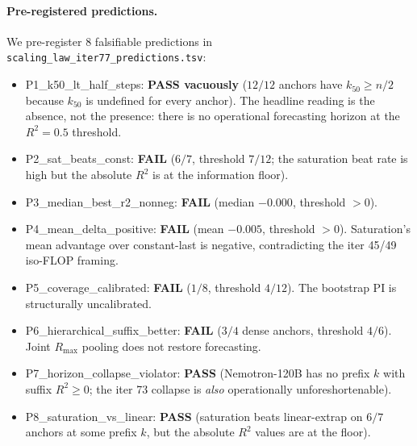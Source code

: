 \paragraph{Pre-registered predictions.}
\label{par:scaling-iter77-preds}
We pre-register 8 falsifiable predictions in
\texttt{scaling\_law\_iter77\_predictions.tsv}:
\begin{itemize}
  \item P1\_k50\_lt\_half\_steps: \textbf{PASS vacuously} ($12/12$
        anchors have $k_{50} \geq n/2$ because $k_{50}$ is undefined for
        every anchor).  The headline reading is the absence, not the
        presence: there is no operational forecasting horizon at the
        $R^2 = 0.5$ threshold.
  \item P2\_sat\_beats\_const: \textbf{FAIL} ($6/7$, threshold $7/12$;
        the saturation beat rate is high but the absolute $R^2$ is
        at the information floor).
  \item P3\_median\_best\_r2\_nonneg: \textbf{FAIL} (median $-0.000$,
        threshold $> 0$).
  \item P4\_mean\_delta\_positive: \textbf{FAIL} (mean $-0.005$,
        threshold $> 0$).  Saturation's mean advantage over
        constant-last is negative, contradicting the iter 45/49
        iso-FLOP framing.
  \item P5\_coverage\_calibrated: \textbf{FAIL} ($1/8$, threshold
        $4/12$).  The bootstrap PI is structurally uncalibrated.
  \item P6\_hierarchical\_suffix\_better: \textbf{FAIL} ($3/4$ dense
        anchors, threshold $4/6$).  Joint $R_\mathrm{max}$ pooling
        does not restore forecasting.
  \item P7\_horizon\_collapse\_violator: \textbf{PASS}
        (Nemotron-120B has no prefix $k$ with suffix $R^2 \geq 0$;
        the iter 73 collapse is \emph{also} operationally
        unforeshortenable).
  \item P8\_saturation\_vs\_linear: \textbf{PASS} (saturation beats
        linear-extrap on $6/7$ anchors at some prefix $k$, but the
        absolute $R^2$ values are at the floor).
\end{itemize}


